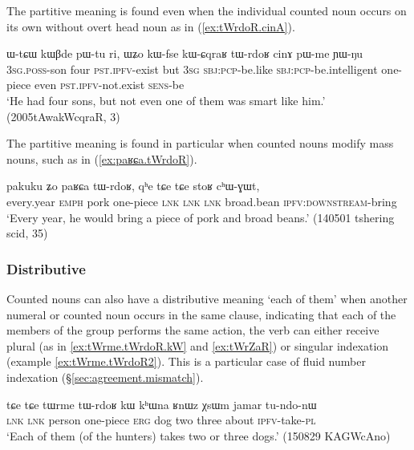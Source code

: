 The partitive meaning is found even when the individual counted noun occurs on its own without overt head noun as in (\ref{ex:tWrdoR.cinA}).

\begin{exe}
	\ex \label{ex:tWrdoR.cinA}
	\gll ɯ-tɕɯ kɯβde pɯ-tu ri, ɯʑo kɯ-fse kɯ-ɕqraʁ tɯ-rdoʁ cinɤ pɯ-me ɲɯ-ŋu 	\\
	\textsc{3sg}.\textsc{poss}-son four \textsc{pst}.\textsc{ipfv}-exist but \textsc{3sg} \textsc{sbj}:\textsc{pcp}-be.like \textsc{sbj}:\textsc{pcp}-be.intelligent one-piece even \textsc{pst}.\textsc{ipfv}-not.exist \textsc{sens}-be \\
	\glt `He had four sons, but not even one of them was smart like him.' (2005tAwakWcqraR, 3)
\end{exe} 


The partitive meaning is found in particular when counted nouns modify mass nouns, such as  in (\ref{ex:paʁɕa.tWrdoR}).  

\begin{exe}
	\ex \label{ex:paʁɕa.tWrdoR}
	\gll pakuku ʑo paʁɕa tɯ-rdoʁ, qʰe tɕe tɕe stoʁ cʰɯ-ɣɯt, \\
	every.year \textsc{emph} pork one-piece \textsc{lnk} \textsc{lnk} \textsc{lnk} broad.bean \textsc{ipfv}:\textsc{downstream}-bring \\
	\glt `Every year, he would bring a piece of pork and broad beans.' (140501 tshering scid, 35)
\end{exe} 

\subsubsection{Distributive} \label{sec:CN.distributive}
Counted nouns can also have a distributive meaning  `each of them' when another numeral or counted noun occurs in the same clause, indicating that each of the members of the group performs the same action, the verb can either receive plural (as in \ref{ex:tWrme.tWrdoR.kW} and \ref{ex:tWrZaR}) or singular indexation (example \ref{ex:tWrme.tWrdoR2}). This is a particular case of fluid number indexation (§\ref{sec:agreement.mismatch}).

\begin{exe}
	\ex \label{ex:tWrme.tWrdoR.kW}
	\gll  tɕe tɕe tɯrme tɯ-rdoʁ kɯ kʰɯna ʁnɯz χsɯm jamar tu-ndo-nɯ \\
	\textsc{lnk} \textsc{lnk}  person one-piece \textsc{erg} dog two three about \textsc{ipfv}-take-\textsc{pl} \\
	\glt `Each of them (of the hunters) takes two or three dogs.' (150829 KAGWcAno)
\end{exe} 

